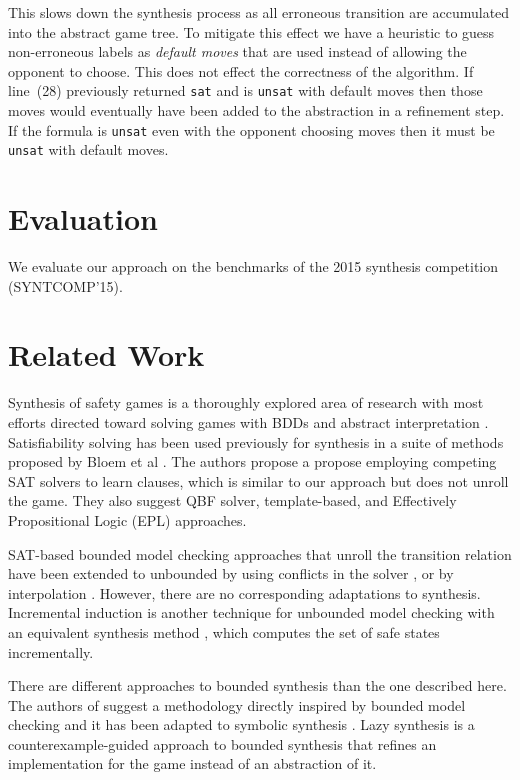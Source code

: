 \documentclass{llncs}
\begin{document}
This slows down the synthesis process as all erroneous transition are
accumulated into the abstract game tree. To mitigate this effect we have a
heuristic to guess non-erroneous labels as \emph{default moves} that are used
instead of allowing the opponent to choose. This does not effect the
correctness of the algorithm. If line~(28) previously returned \texttt{sat} and
is \texttt{unsat} with default moves then those moves would eventually have
been added to the abstraction in a refinement step. If the formula is
\texttt{unsat} even with the opponent choosing moves then it must be
\texttt{unsat} with default moves.

\section{Evaluation}

We evaluate our approach on the benchmarks of the 2015 synthesis competition
(SYNTCOMP'15). 

\section{Related Work}

Synthesis of safety games is a thoroughly explored area of research with most
efforts directed toward solving games with BDDs \cite{burch1990} and abstract
interpretation \cite{walker2014,brenguier2014}. Satisfiability solving has been used
previously for synthesis in a suite of methods proposed by Bloem et al
\cite{bloem2014}. The authors propose a propose employing competing SAT solvers
to learn clauses, which is similar to our approach but does not unroll the
game. They also suggest QBF solver, template-based, and Effectively
Propositional Logic (EPL) approaches.

SAT-based bounded model checking approaches that unroll the transition relation
have been extended to unbounded by using conflicts in the solver
\cite{mcmillan2002}, or by interpolation \cite{mcmillan2003}. However, there
are no corresponding adaptations to synthesis. Incremental induction
\cite{bradley2011} is another technique for unbounded model checking with an
equivalent synthesis method \cite{morgenstern2013}, which computes the set of
safe states incrementally.

There are different approaches to bounded synthesis than the one described
here. The authors of \cite{finkbeiner2013} suggest a methodology directly
inspired by bounded model checking and it has been adapted to symbolic
synthesis \cite{ehlers2010}. Lazy synthesis \cite{finkbeiner2012} is a
counterexample-guided approach to bounded synthesis that refines an
implementation for the game instead of an abstraction of it.
\end{document}
